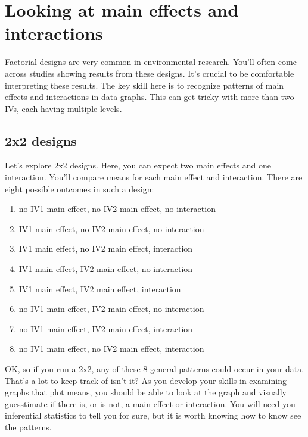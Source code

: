 \documentclass[
  letterpaper,
  DIV=11,
  numbers=noendperiod]{scrreprt}
\providecommand{\tightlist}{%
  \setlength{\itemsep}{0pt}\setlength{\parskip}{0pt}}\usepackage{longtable,booktabs,array}
\begin{document}
\section{Looking at main effects and
interactions}\label{looking-at-main-effects-and-interactions}

Factorial designs are very common in environmental research. You'll
often come across studies showing results from these designs. It's
crucial to be comfortable interpreting these results. The key skill here
is to recognize patterns of main effects and interactions in data
graphs. This can get tricky with more than two IVs, each having multiple
levels.

\subsection{2x2 designs}\label{x2-designs-1}

Let's explore 2x2 designs. Here, you can expect two main effects and one
interaction. You'll compare means for each main effect and interaction.
There are eight possible outcomes in such a design:

\begin{enumerate}
\def\labelenumi{\arabic{enumi}.}
\tightlist
\item
  no IV1 main effect, no IV2 main effect, no interaction
\item
  IV1 main effect, no IV2 main effect, no interaction
\item
  IV1 main effect, no IV2 main effect, interaction
\item
  IV1 main effect, IV2 main effect, no interaction
\item
  IV1 main effect, IV2 main effect, interaction
\item
  no IV1 main effect, IV2 main effect, no interaction
\item
  no IV1 main effect, IV2 main effect, interaction
\item
  no IV1 main effect, no IV2 main effect, interaction
\end{enumerate}

OK, so if you run a 2x2, any of these 8 general patterns could occur in
your data. That's a lot to keep track of isn't it? As you develop your
skills in examining graphs that plot means, you should be able to look
at the graph and visually guesstimate if there is, or is not, a main
effect or interaction. You will need you inferential statistics to tell
you for sure, but it is worth knowing how to know see the patterns.
\end{document}
